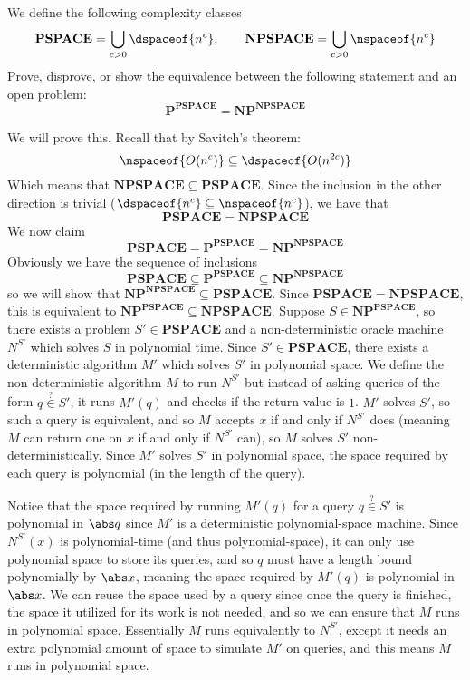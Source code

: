 \documentclass[10pt]{article}
\def\P{\mathbf{P}}
\def\NP{\mathbf{NP}}
\begin{document}


\bigskip

\def\NPSPACE{\mathbf{NPSPACE}}
\def\PSPACE{\mathbf{PSPACE}}
\begin{exercise*}

    We define the following complexity classes
    \[ \PSPACE = \bigcup_{c>0}\dspaceof{n^c},\qquad \NPSPACE = \bigcup_{c>0}\nspaceof{n^c} \]
    Prove, disprove, or show the equivalence between the following statement and an open problem:
    \[ \P^\PSPACE = \NP^\NPSPACE \]

\end{exercise*}

We will prove this.
Recall that by Savitch's theorem:
\[ \nspaceof{O(n^c)} \subseteq \dspaceof{O(n^{2c})} \]
Which means that $\NPSPACE \subseteq \PSPACE$.
Since the inclusion in the other direction is trivial ($\dspaceof{n^c}\subseteq\nspaceof{n^c}$), we have that
\[ \PSPACE = \NPSPACE \]
We now claim
\[ \PSPACE = \P^\PSPACE = \NP^\NPSPACE \]
Obviously we have the sequence of inclusions
\[ \PSPACE \subseteq \P^\PSPACE \subseteq \NP^\NPSPACE \]
so we will show that $\NP^\NPSPACE\subseteq\PSPACE$.
Since $\PSPACE=\NPSPACE$, this is equivalent to $\NP^\PSPACE\subseteq\NPSPACE$.
Suppose $S\in\NP^\PSPACE$, so there exists a problem $S'\in\PSPACE$ and a non-deterministic oracle machine $N^{S'}$ which solves $S$ in polynomial time.
Since $S'\in\PSPACE$, there exists a deterministic algorithm $M'$ which solves $S'$ in polynomial space.
We define the non-deterministic algorithm $M$ to run $N^{S'}$ but instead of asking queries of the form $q\mathrel{\mathop\in\limits^{\scriptscriptstyle?}}S'$, it runs $M'(q)$ and checks if the return value
is $1$.
$M'$ solves $S'$, so such a query is equivalent, and so $M$ accepts $x$ if and only if $N^{S'}$ does (meaning $M$ can return one on $x$ if and only if $N^{S'}$ can), so $M$ solves $S'$ non-deterministically.
Since $M'$ solves $S'$ in polynomial space, the space required by each query is polynomial (in the length of the query).

Notice that the space required by running $M'(q)$ for a query $q\mathrel{\mathop\in\limits^{\scriptscriptstyle?}}S'$ is polynomial in $\abs q$ since $M'$ is a deterministic polynomial-space machine.
Since $N^{S'}(x)$ is polynomial-time (and thus polynomial-space), it can only use polynomial space to store its queries, and so $q$ must have a length bound polynomially by $\abs x$, meaning the space
required by $M'(q)$ is polynomial in $\abs x$.
We can reuse the space used by a query since once the query is finished, the space it utilized for its work is not needed, and so we can ensure that $M$ runs in polynomial space.
Essentially $M$ runs equivalently to $N^{S'}$, except it needs an extra polynomial amount of space to simulate $M'$ on queries, and this means $M$ runs in polynomial space.
\end{document}
